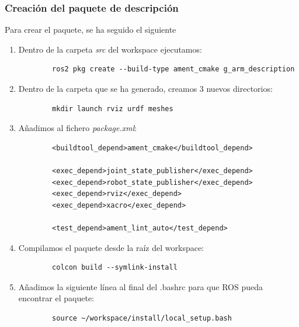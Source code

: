 \subsubsection{Creación del paquete de descripción}
\noindent Para crear el paquete, se ha seguido el siguiente
\begin{enumerate}
    \item Dentro de la carpeta \textit{src} del workspace ejecutamos:
    \begin{verbatim}
        ros2 pkg create --build-type ament_cmake g_arm_description
    \end{verbatim}   
    \item Dentro de la carpeta que se ha generado, creamos 3 nuevos directorios:
    \begin{verbatim}
        mkdir launch rviz urdf meshes
    \end{verbatim} 
        
    \item Añadimos al fichero \textit{package.xml}: 
    
    \begin{lstlisting}
        <buildtool_depend>ament_cmake</buildtool_depend>

        <exec_depend>joint_state_publisher</exec_depend>
        <exec_depend>robot_state_publisher</exec_depend>
        <exec_depend>rviz</exec_depend>
        <exec_depend>xacro</exec_depend>

        <test_depend>ament_lint_auto</test_depend>
    \end{lstlisting}
        
    \item Compilamos el paquete desde la raíz del workspace:
    \begin{verbatim}
        colcon build --symlink-install
    \end{verbatim}
    \item Añadimos la siguiente línea al final del .bashrc para que ROS pueda encontrar el paquete:
    \begin{verbatim}
        source ~/workspace/install/local_setup.bash
    \end{verbatim}
    
    \end{enumerate}


